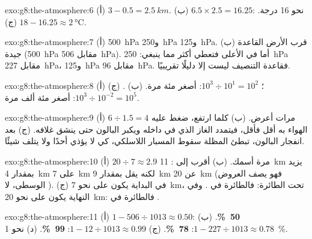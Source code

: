 \begin{solution}{exo:g8:the-atmosphere:6}
(أ) $3 - 0.5 = \qty{2.5}{km}$. (ب) $6.5 \times 2.5 = 16.25$: نحو 16
درجة. (ج) $18 - 16.25 \approx \qty{2}{\degreeCelsius}$.
\end{solution}

\begin{solution}{exo:g8:the-atmosphere:7}
(أ) \qty{500}{hPa} و\qty{250}{hPa} و\qty{125}{hPa}. (ب) قرب
الأرض القاعدة جيدة (\qty{500}{hPa} مقابل \qty{506}{hPa}). أما في الأعلى
فتعطي أكثر مما ينبغي: \qty{250}{hPa} مقابل \qty{227}{hPa}،
و\qty{125}{hPa} مقابل \qty{96}{hPa}. فقاعدة التنصيف ليست إلا دليلًا
تقريبيًا.
\end{solution}

\begin{solution}{exo:g8:the-atmosphere:8}
(أ) ؛ $10^3 \div 10^1 = 10^2$: أصغر مئة
مرة. (ب) . (ج) $10^3 \div 10^{-2} =
10^5$: أصغر مئة ألف مرة.
\end{solution}

\begin{solution}{exo:g8:the-atmosphere:9}
(أ) $6 \div 1.5 = 4$ مرات أعرض. (ب) كلما ارتفع، ضغط عليه الهواء  به
أقل فأقل، فيتمدد الغاز الذي في داخله ويكبر البالون حتى ينشق غلافه. (ج)
بعد انفجار البالون، تبطئ المظلة سقوط المسبار اللاسلكي، كي لا يؤذي أحدًا
ولا يتلف شيئًا.
\end{solution}

\begin{solution}{exo:g8:the-atmosphere:10}
(أ) $20 \div 7 \approx 2.9$ مرة أسمك. (ب) أقرب إلى :
 \qty{11}{km} يزيد بمقدار \qty{4}{km} على \qty{7}{km} لكنه يقل بمقدار \qty{9}{km} عن \qty{20}{km} (فهو يصف العروض الوسطى، لا ).
(ج) في البداية يكون  على  نحو \qty{7}{km}، تحت
الطائرة: فالطائرة في . وفي النهاية يكون  على 
نحو \qty{20}{km}: فالطائرة في .
\end{solution}

\begin{solution}{exo:g8:the-atmosphere:11}
(أ) $1 - 506 \div 1013 \approx 0.50$: \textbf{50~\%}. (ب) $1 - 227 \div
1013 \approx 0.78$: \textbf{78~\%}. (ج) $1 - 12 \div 1013 \approx 0.99$:
\textbf{99~\%}. (د) نحو 1~\%.
\end{solution}


